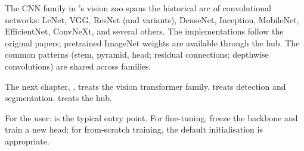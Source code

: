 The CNN family in \Lucid's vision zoo spans the historical
arc of convolutional networks: LeNet, VGG, ResNet (and
variants), DenseNet, Inception, MobileNet, EfficientNet,
ConvNeXt, and several others. The implementations follow the
original papers; pretrained ImageNet weights are available
through the hub. The common patterns (stem, pyramid, head;
residual connections; depthwise convolutions) are shared across
families.

The next chapter, , treats the
vision transformer family.
 treats detection and
segmentation.  treats the hub.

\begin{lucidnote}
For the user:  is
the typical entry point. For fine-tuning, freeze the backbone
and train a new head; for from-scratch training, the default
initialisation is appropriate.
\end{lucidnote}
